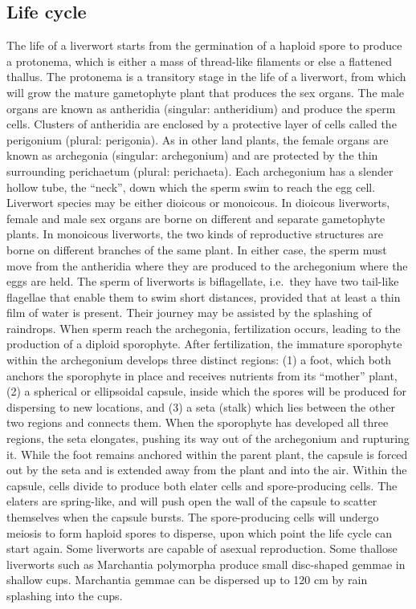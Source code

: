 \documentclass[]{book}
\theoremstyle{definition}
\theoremstyle{definition}
\theoremstyle{definition}
\theoremstyle{remark}
\begin{document}
\subsection{Life cycle}\label{life-cycle-1}

The life of a liverwort starts from the germination of a haploid spore
to produce a protonema, which is either a mass of thread-like filaments
or else a flattened thallus. The protonema is a transitory stage in the
life of a liverwort, from which will grow the mature gametophyte plant
that produces the sex organs. The male organs are known as antheridia
(singular: antheridium) and produce the sperm cells. Clusters of
antheridia are enclosed by a protective layer of cells called the
perigonium (plural: perigonia). As in other land plants, the female
organs are known as archegonia (singular: archegonium) and are protected
by the thin surrounding perichaetum (plural: perichaeta). Each
archegonium has a slender hollow tube, the ``neck'', down which the
sperm swim to reach the egg cell. Liverwort species may be either
dioicous or monoicous. In dioicous liverworts, female and male sex
organs are borne on different and separate gametophyte plants. In
monoicous liverworts, the two kinds of reproductive structures are borne
on different branches of the same plant. In either case, the sperm must
move from the antheridia where they are produced to the archegonium
where the eggs are held. The sperm of liverworts is biflagellate,
i.e.~they have two tail-like flagellae that enable them to swim short
distances, provided that at least a thin film of water is present. Their
journey may be assisted by the splashing of raindrops. When sperm reach
the archegonia, fertilization occurs, leading to the production of a
diploid sporophyte. After fertilization, the immature sporophyte within
the archegonium develops three distinct regions: (1) a foot, which both
anchors the sporophyte in place and receives nutrients from its
``mother'' plant, (2) a spherical or ellipsoidal capsule, inside which
the spores will be produced for dispersing to new locations, and (3) a
seta (stalk) which lies between the other two regions and connects them.
When the sporophyte has developed all three regions, the seta elongates,
pushing its way out of the archegonium and rupturing it. While the foot
remains anchored within the parent plant, the capsule is forced out by
the seta and is extended away from the plant and into the air. Within
the capsule, cells divide to produce both elater cells and
spore-producing cells. The elaters are spring-like, and will push open
the wall of the capsule to scatter themselves when the capsule bursts.
The spore-producing cells will undergo meiosis to form haploid spores to
disperse, upon which point the life cycle can start again. Some
liverworts are capable of asexual reproduction. Some thallose liverworts
such as Marchantia polymorpha produce small disc-shaped gemmae in
shallow cups. Marchantia gemmae can be dispersed up to 120 cm by rain
splashing into the cups.
\end{document}
